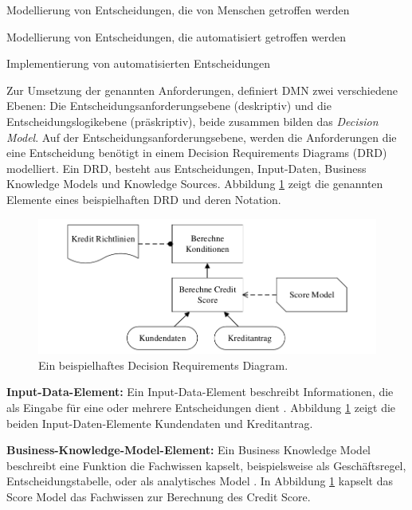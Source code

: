 \begin{enumerate*}
\item Modellierung von Entscheidungen, die von Menschen getroffen werden
\item Modellierung von Entscheidungen, die automatisiert getroffen werden 
\item Implementierung von automatisierten Entscheidungen    
\end{enumerate*}

Zur Umsetzung der genannten Anforderungen, definiert DMN zwei verschiedene Ebenen: Die Entscheidungsanforderungsebene (deskriptiv) und die Entscheidungslogikebene (präskriptiv), beide zusammen bilden das \emph{Decision Model}. Auf der Entscheidungsanforderungsebene, werden die Anforderungen die eine Entscheidung benötigt in einem Decision Requirements Diagrams (DRD) modelliert. Ein DRD, besteht aus Entscheidungen, Input-Daten, Business Knowledge Models und Knowledge Sources. Abbildung \ref{fig:drd} \cite[vgl. S. 21]{OM16} zeigt die genannten Elemente eines beispielhaften DRD und deren Notation.     

\begin{figure}[ht]
\centering
\includegraphics{images/drd.pdf}
\caption{Ein beispielhaftes Decision Requirements Diagram.}
\label{fig:drd}
\end{figure}

\textbf{Input-Data-Element:} Ein Input-Data-Element beschreibt Informationen, die als Eingabe für eine oder mehrere Entscheidungen dient \cite[vgl. S. 30]{OM16}. Abbildung \ref{fig:drd} zeigt die beiden Input-Daten-Elemente Kundendaten und Kreditantrag. 

\textbf{Business-Knowledge-Model-Element:} Ein Business Knowledge Model beschreibt eine Funktion die Fachwissen kapselt, beispielsweise als Geschäftsregel, Entscheidungstabelle, oder als analytisches Model \cite[vgl. S. 30]{OM16}. In Abbildung \ref{fig:drd} kapselt das Score Model das Fachwissen zur Berechnung des Credit Score.

